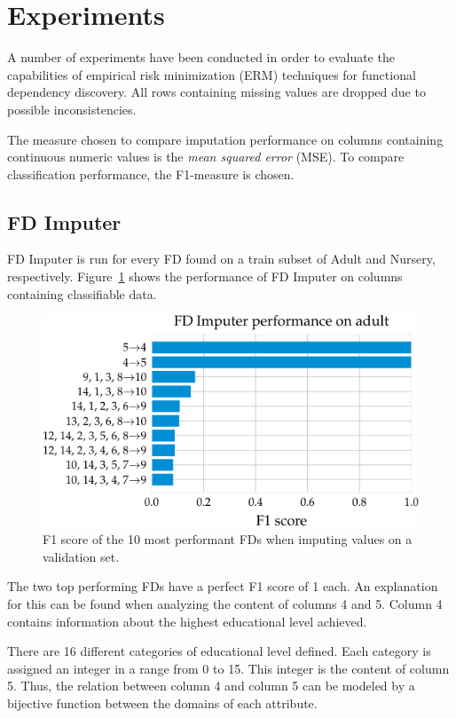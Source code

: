 \newpage
\section{Experiments}
A number of experiments have been conducted in order to evaluate the capabilities of empirical risk minimization (ERM) techniques for functional dependency discovery.
All rows containing missing values are dropped due to possible inconsistencies.

The measure chosen to compare imputation performance on columns containing continuous numeric values is the \emph{mean squared error} (MSE).
To compare classification performance, the F1-measure is chosen.

\subsection{FD Imputer}
FD Imputer is run for every FD found on a train subset of Adult and Nursery, respectively.
Figure~\ref{fig:f1_fd_adult} shows the performance of FD Imputer on columns containing classifiable data.
\begin{figure}[h]
     \centering
     \includegraphics[width=.8\textwidth]{../figures/adult/f1_fd_imputer_adult.pdf}
     \caption{F1 score of the 10 most performant FDs when imputing values on a validation set.}
     \label{fig:f1_fd_adult}
 \end{figure}
The two top performing FDs have a perfect F1 score of 1 each.
An explanation for this can be found when analyzing the content of columns 4 and 5.
Column 4 contains information about the highest educational level achieved.

There are 16 different categories of educational level defined.
Each category is assigned an integer in a range from 0 to 15.
This integer is the content of column 5.
Thus, the relation between column 4 and column 5 can be modeled by a bijective function between the domains of each attribute.

